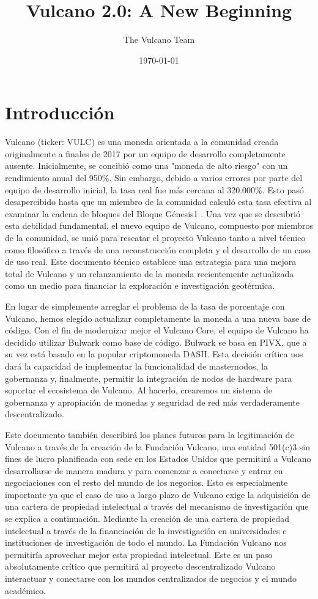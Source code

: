 \documentclass[A4paper, 12pt]{article}
\begin{document}
\title{Vulcano 2.0: A New Beginning}
\author{The Vulcano Team}
\date{\today}

\newpage
\tableofcontents
\newpage
\section{Introducción}

Vulcano (ticker: VULC) es una moneda orientada a la comunidad creada originalmente a finales de 2017 por un equipo de desarrollo completamente ausente.   Inicialmente, se concibió como una "moneda de alto riesgo" con un rendimiento anual del 950\%. Sin embargo, debido a varios errores por parte del equipo de desarrollo inicial, la tasa real fue más cercana al 320.000\%.   Esto pasó desapercibido hasta que un miembro de la comunidad calculó esta tasa efectiva al examinar la cadena de bloques del Bloque Génesis1 .   Una vez que se descubrió esta debilidad fundamental, el nuevo equipo de Vulcano, compuesto por miembros de la comunidad, se unió para rescatar el proyecto Vulcano tanto a nivel técnico como filosófico a través de una reconstrucción completa y el desarrollo de un caso de uso real. Este documento técnico establece una estrategia para una mejora total de Vulcano y un relanzamiento de la moneda recientemente actualizada como un medio para financiar la exploración e investigación geotérmica.

En lugar de simplemente arreglar el problema de la tasa de porcentaje con Vulcano, hemos elegido actualizar completamente la moneda a una nueva base de código.    Con el fin de modernizar mejor el Vulcano Core, el equipo de Vulcano ha decidido utilizar Bulwark como base de código.  Bulwark se basa en PIVX, que a su vez está basado en la popular criptomoneda DASH. Esta decisión crítica nos dará la capacidad de implementar la funcionalidad de masternodos, la gobernanza y, finalmente, permitir la integración de nodos de hardware para soportar el ecosistema de Vulcano.  Al hacerlo, crearemos un sistema de gobernanza y apropiación de monedas y seguridad de red más verdaderamente descentralizado.

Este documento también describirá los planes futuros para la legitimación de Vulcano a través de la creación de la Fundación Vulcano, una entidad 501(c)3 sin fines de lucro planificada con sede en los Estados Unidos que permitirá a Vulcano desarrollarse de manera madura y para comenzar a conectarse y entrar en negociaciones con el resto del mundo de los negocios. Esto es especialmente importante ya que el caso de uso a largo plazo de Vulcano exige la adquisición de una cartera de propiedad intelectual a través del mecanismo de investigación que se explica a continuación. Mediante la creación de una cartera de propiedad intelectual a través de la financiación de la investigación en universidades e instituciones de investigación de todo el mundo. La Fundación Vulcano nos permitiría aprovechar mejor esta propiedad intelectual. Este es un paso absolutamente crítico que permitirá al proyecto descentralizado Vulcano interactuar y conectarse con los mundos centralizados de negocios y el mundo académico.
\end{document}
